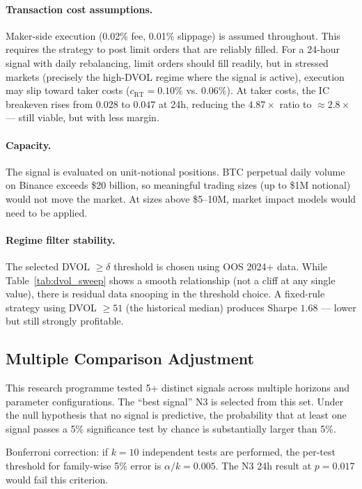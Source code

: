 \documentclass[12pt, a4paper]{article}
\theoremstyle{plain}
\theoremstyle{definition}
\begin{document}
\paragraph{Transaction cost assumptions.}
Maker-side execution (0.02\% fee, 0.01\% slippage) is assumed throughout.
This requires the strategy to post limit orders that are reliably filled.
For a 24-hour signal with daily rebalancing, limit orders should fill
readily, but in stressed markets (precisely the high-DVOL regime where
the signal is active), execution may slip toward taker costs
($c_{\mathrm{RT}} = 0.10\%$ vs. $0.06\%$). At taker costs, the IC breakeven
rises from $0.028$ to $0.047$ at 24h, reducing the $4.87\times$ ratio to
$\approx 2.8\times$ --- still viable, but with less margin.

\paragraph{Capacity.}
The signal is evaluated on unit-notional positions. BTC perpetual daily
volume on Binance exceeds \$20 billion, so meaningful trading sizes
(up to \$1M notional) would not move the market. At sizes above \$5--10M,
market impact models would need to be applied.

\paragraph{Regime filter stability.}
The selected DVOL $\geq \delta$ threshold is chosen using OOS 2024+ data. While
Table~\ref{tab:dvol_sweep} shows a smooth relationship (not a cliff
at any single value), there is residual data snooping in the threshold choice.
A fixed-rule strategy using DVOL $\geq 51$ (the historical median)
produces Sharpe $1.68$ --- lower but still strongly profitable.

\subsection{Multiple Comparison Adjustment}

This research programme tested 5+ distinct signals across multiple
horizons and parameter configurations. The ``best signal'' N3 is
selected from this set. Under the null hypothesis that no signal is
predictive, the probability that at least one signal passes a 5\%
significance test by chance is substantially larger than 5\%.

Bonferroni correction: if $k = 10$ independent tests are performed,
the per-test threshold for family-wise 5\% error is $\alpha/k = 0.005$.
The N3 24h result at $p = 0.017$ would fail this criterion.
\end{document}
